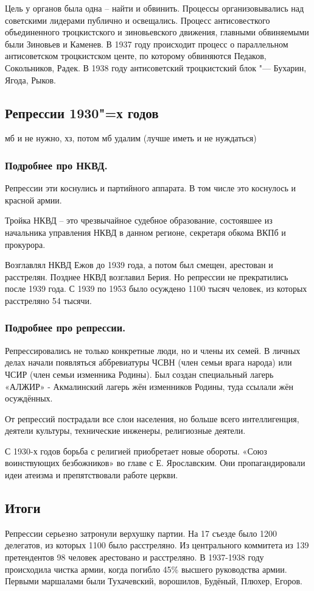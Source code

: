 Цель у органов была одна – найти и обвинить. Процессы организовывались над советскими лидерами публично и освещались. Процесс антисовесткого объединенного троцкистского и зиновьевского движения, главными обвиняемыми были Зиновьев и Каменев. В 1937 году происходит процесс о параллельном антисоветском троцкистском центе, по которому обвиняются Педаков, Сокольников, Радек. В 1938 году антисоветский троцкистский блок "--- Бухарин, Ягода, Рыков.

\subsection{Репрессии 1930"=х годов}

мб и не нужно, хз, потом мб удалим (лучше иметь и не нуждаться)

\subsubsection{\textbf{Подробнее про НКВД.}}

Репрессии эти коснулись и партийного аппарата. В том числе это коснулось и красной армии.

Тройка НКВД – это чрезвычайное судебное образование, состоявшее из начальника управления НКВД в данном регионе, секретаря обкома ВКПб и прокурора.  

Возглавлял НКВД Ежов до 1939 года, а потом был смещен, арестован и расстрелян. Позднее НКВД возглавил Берия. Но репрессии не прекратились после 1939 года. С 1939 по 1953 было осуждено 1100 тысяч человек, из которых расстреляно 54 тысячи. 

\subsubsection{\textbf{Подробнее про репрессии.}}

Репрессировались не только конкретные люди, но и члены их семей. В личных делах начали появляться аббревиатуры ЧСВН (член семьи врага народа) или ЧСИР (член семьи изменника Родины). Был создан специальный лагерь «АЛЖИР» - Акмалинский лагерь жён изменников Родины, туда ссылали жён осуждённых.

От репрессий пострадали все слои населения, но больше всего интеллигенция, деятели культуры, технические инженеры, религиозные деятели. 

С 1930-х годов борьба с религией приобретает новые обороты. «Союз воинствующих безбожников» во главе с Е. Ярославским. Они пропагандировали идеи атеизма и препятствовали работе церкви.

\subsection{Итоги}

Репрессии серьезно затронули верхушку партии. На 17 съезде было 1200 делегатов, из которых 1100 было расстреляно. Из центрального коммитета из 139 претендентов 98 человек арестовано и расстреляно. 
В 1937-1938 году происходила чистка армии, когда погибло 45\% высшего руководства армии.
Первыми маршалами были Тухачевский, ворошилов, Будёный, Плюхер, Егоров. 